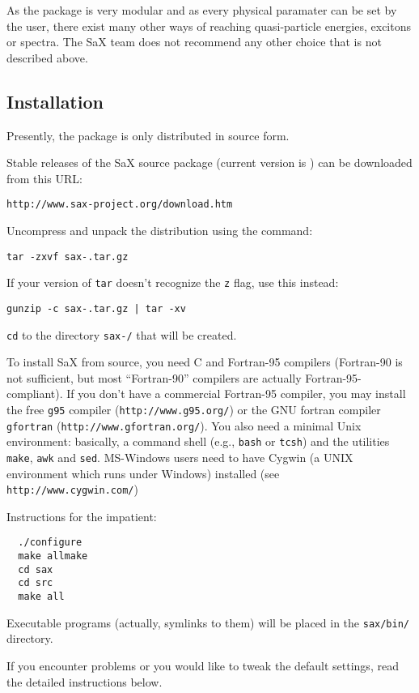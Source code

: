 \documentclass[11pt]{article}
\begin{document}
As the package is very modular and as every physical paramater can be set by the user, there exist many other ways of reaching quasi-particle energies, excitons or spectra. The SaX team does not recommend any other choice that is not described above. 

\subsection{Installation}
  \label{installation}

Presently, the \SAX package is only distributed in source
form.

Stable releases of the SaX source package (current version
is \SAXVERSION) can be downloaded from this URL:
\medskip

\texttt{http://www.sax-project.org/download.htm}
\medskip

\noindent
Uncompress and unpack the distribution using the command:
\medskip

\texttt{tar -zxvf sax-\SAXVERSION.tar.gz}
\medskip

\noindent
If your version of \texttt{tar} doesn't recognize the \texttt{z} flag,
use this instead:
\medskip

\texttt{gunzip -c sax-\SAXVERSION.tar.gz | tar -xv}
\medskip

\noindent
\texttt{cd} to the directory \texttt{sax-\SAXVERSION/} that will be created.

To install SaX from source, you need C and Fortran-95
compilers (Fortran-90 is not sufficient, but most ``Fortran-90''
compilers are actually Fortran-95-compliant).
If you don't have a commercial Fortran-95 compiler, you may install
the free \texttt{g95} compiler (\texttt{http://www.g95.org/})
or the GNU fortran compiler \texttt{gfortran} (\texttt{http://www.gfortran.org/}).
You also need a minimal Unix environment: basically, a command shell
(e.g., \texttt{bash} or \texttt{tcsh}) and the utilities
\texttt{make}, \texttt{awk} and \texttt{sed}.
MS-Windows users need to have Cygwin (a UNIX environment which runs
under Windows) installed (see \texttt{http://www.cygwin.com/})

Instructions for the impatient:
\begin{verbatim}
  ./configure
  make allmake
  cd sax
  cd src
  make all
\end{verbatim}
Executable programs (actually, symlinks to them) will be placed in the
\texttt{sax/bin/} directory.

If you encounter problems or you would like to tweak the default settings, read
the detailed instructions below.
\end{document}
